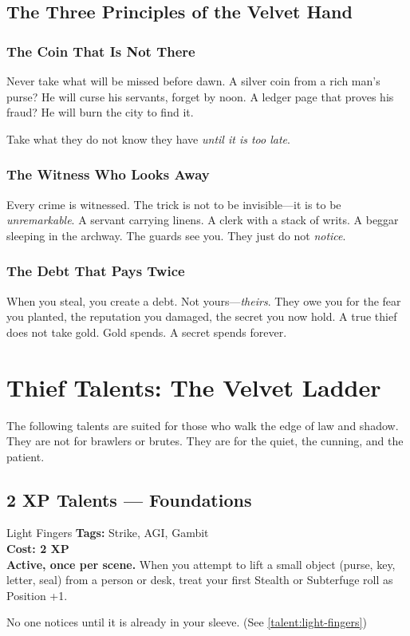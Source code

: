 \documentclass[10pt,twoside]{book}
\begin{document}
\section{The Three Principles of the Velvet Hand}

\subsection{The Coin That Is Not There}

Never take what will be missed before dawn. A silver coin from a rich man's purse? He will curse his servants, forget by noon. A ledger page that proves his fraud? He will burn the city to find it.

Take what they do not know they have \emph{until it is too late}.

\subsection{The Witness Who Looks Away}

Every crime is witnessed. The trick is not to be invisible---it is to be \emph{unremarkable}. A servant carrying linens. A clerk with a stack of writs. A beggar sleeping in the archway. The guards see you. They just do not \emph{notice}.

\subsection{The Debt That Pays Twice}

When you steal, you create a debt. Not yours---\emph{theirs}. They owe you for the fear you planted, the reputation you damaged, the secret you now hold. A true thief does not take gold. Gold spends. A secret spends forever.

\chapter{Thief Talents: The Velvet Ladder}
\label{ch:thief-talents}

The following talents are suited for those who walk the edge of law and shadow. They are not for brawlers or brutes. They are for the quiet, the cunning, and the patient.

\section{2 XP Talents --- Foundations}

\begin{talentbox}{Light Fingers}
\textbf{Tags:} Strike, AGI, Gambit \\
\textbf{Cost: 2 XP} \\
\textbf{Active, once per scene.} When you attempt to lift a small object (purse, key, letter, seal) from a person or desk, treat your first Stealth or Subterfuge roll as Position +1.

No one notices until it is already in your sleeve. (See \ref{talent:light-fingers})
\end{talentbox}
\end{document}
